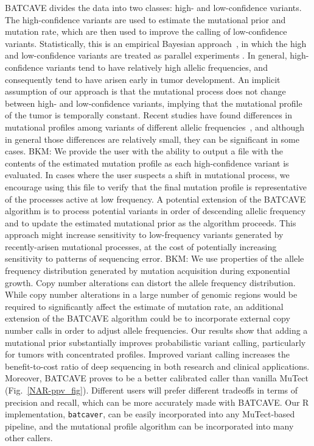 \documentclass[a4,center,fleqn]{NAR}
\newcommand{\bkmcomment}[1]{{\color{blue}BKM: #1}}
\newcommand{\batcave}{BATCAVE\xspace}
\begin{document}
\batcave divides the data into two classes: high- and low-confidence variants.
The high-confidence variants are used to estimate the mutational prior and mutation rate, which are then used to improve the calling of low-confidence variants.
Statistically, this is an empirical Bayesian approach~\cite{Robbins1954}, in which the high and low-confidence variants are treated as parallel experiments \cite{Morris1983,Efron2014}. 
In general, high-confidence variants tend to have relatively high allelic frequencies, and consequently tend to have arisen early in tumor development.
An  implicit assumption of our approach is that the mutational process does not change between high- and low-confidence variants, implying that the mutational profile of the tumor is temporally constant.
Recent studies have found differences in mutational profiles among variants of different allelic frequencies~\cite{Rubanova2018a}, and although in general those differences are relatively small, they can be significant in some cases.
\bkmcomment{We provide the user with the ability to output a file with the contents of the estimated mutation profile as each high-confidence variant is evaluated.
In cases where the user suspects a shift in mutational process, we encourage using this file to verify that the final mutation profile is representative of the processes active at low frequency.}
A potential extension of the \batcave algorithm is to process potential variants in order of descending allelic frequency and to update the estimated mutational prior as the algorithm proceeds.
This approach might increase sensitivity to low-frequency variants generated by recently-arisen mutational processes, at the cost of potentially increasing sensitivity to patterns of sequencing error.
\bkmcomment{We use properties of the allele frequency distribution generated by mutation acquisition during exponential growth.
Copy number alterations can distort the allele frequency distribution.
While copy number alterations in a large number of genomic regions would be required to significantly affect the estimate of mutation rate, an additional extension of the \batcave algorithm could be to incorporate external copy number calls in order to adjust allele frequencies.}
Our results show that adding a mutational prior substantially improves probabilistic variant calling, particularly for tumors with concentrated profiles.
Improved variant calling increases the benefit-to-cost ratio of deep sequencing in both research and clinical applications.
Moreover, \batcave proves to be a better calibrated caller than vanilla MuTect (Fig.~\ref{NAR-ppv_fig}).
Different users will prefer different tradeoffs in terms of precision and recall, which can be more accurately made with \batcave.
Our R implementation, \texttt{batcaver}, can be easily incorporated into any MuTect-based pipeline, and the mutational profile algorithm can be incorporated into many other callers.
\end{document}
